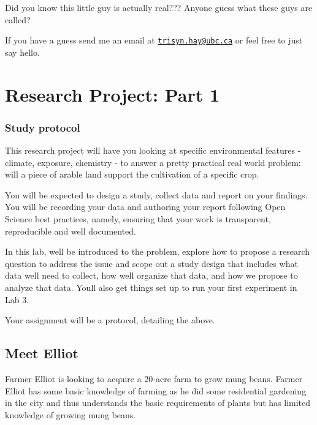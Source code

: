 \documentclass[
]{book}
\begin{document}
Did you know this little guy is actually real??? Anyone guess what these guys are called?

If you have a guess send me an email at \href{mailto:trisyn.hay@ubc.ca}{\nolinkurl{trisyn.hay@ubc.ca}} or feel free to just say hello.

\hypertarget{research-project-part-1}{%
\chapter*{Research Project: Part 1}\label{research-project-part-1}}

\hypertarget{study-protocol}{%
\subsection*{Study protocol}\label{study-protocol}}

This research project will have you looking at specific environmental features - climate, exposure, chemistry - to answer a pretty practical real world problem: will a piece of arable land support the cultivation of a specific crop.

You will be expected to design a study, collect data and report on your findings. You will be recording your data and authoring your report following Open Science best practices, namely, ensuring that your work is transparent, reproducible and well documented.

In this lab, we\textquotesingle ll be introduced to the problem, explore how to propose a research question to address the issue and scope out a study design that includes what data we\textquotesingle ll need to collect, how we\textquotesingle ll organize that data, and how we propose to analyze that data. You\textquotesingle ll also get things set up to run your first experiment in Lab 3.

Your assignment will be a protocol, detailing the above.

\hypertarget{meet-elliot}{%
\section*{Meet Elliot}\label{meet-elliot}}

Farmer Elliot is looking to acquire a 20-acre farm to grow mung beans. Farmer Elliot has some basic knowledge of farming as he did some residential gardening in the city and thus understands the basic requirements of plants but has limited knowledge of growing mung beans.
\end{document}
